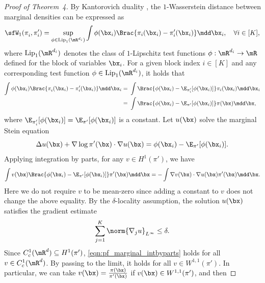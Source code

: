 \documentclass[11pt]{article}
\newcommand{\Lip}{{\rm Lip}}
\begin{document}
\begin{proof}[Proof of Theorem~4]
By Kantorovich duality \cite{MR2459454}, the $1$-Wasserstein distance between marginal densities can be expressed as
\begin{equation}
    \sfW_1(\pi_i^{},\pi_i') = \sup_{\phi \in \Lip_1(\mR^{d_i})} \int \phi (\bx_i) \Brac{ \pi_i(\bx_i) - \pi_i' (\bx_i)} \mdd \bx_i, \quad \forall i \in [K],
\end{equation}
where $\Lip_1(\mR^{d_i})$ denotes the class of $1$-Lipschitz test functions $\phi: \mR^{d_i} \rightarrow \mR$ defined for the block of variables $\bx_i$.
%
For a given block index $i \in [K]$ and any corresponding test function $\phi \in \Lip_1(\mR^{d_i})$, it holds that
\begin{equation}
\begin{split}
    \int \phi (\bx_i) \Brac{ \pi_i^{} (\bx_i) - \pi_i' (\bx_i)} \mdd \bx_i =~& \int \Brac{ \phi (\bx_i) - \E_{\pi_i'}[\phi(\bx_i)] } \pi_i(\bx_i) \mdd \bx_i \\
    =~& \int \Brac{ \phi (\bx_i) - \E_{\pi'}[\phi(\bx_i)] } \pi(\bx) \mdd \bx,
\end{split}
\end{equation}
where $\E_{\pi_i'}[\phi(\bx_i)] = \E_{\pi'}[\phi(\bx_i)]$ is a constant.
%
Let $u(\bx)$ solve the marginal Stein equation
\begin{equation}
    \Delta u(\bx) + \nabla \log \pi' (\bx) \cdot \nabla u(\bx) = \phi(\bx_i) - \E_{\pi'} [\phi(\bx_i)].
\end{equation}
Applying integration by parts, for any $v \in H^1(\pi')$, we have
\begin{equation}
\label{eqn:pf_marginal_intbyparts}
    \int v(\bx) \Brac{ \phi(\bx_i) - \E_{\pi'} [\phi(\bx_i)] } \pi' (\bx) \mdd \bx = - \int \nabla v(\bx) \cdot \nabla u(\bx) \pi' (\bx) \mdd \bx.
\end{equation}
Here we do not require $v$ to be mean-zero since adding a constant to $v$ does not change the above equality.
By the $\delta$-locality assumption, the solution $u(\bx)$ satisfies the gradient estimate
\begin{equation}
\label{eqn:pf_marginal_grad_est}
    \sum_{j=1}^K \norm{\nabla_j u}_{L^\infty} \le \delta.
\end{equation}
Since $C_c^1(\mR^d) \subseteq H^1(\pi')$, \eqref{eqn:pf_marginal_intbyparts} holds for all $v \in C_c^1(\mR^d)$. By passing to the limit, it holds for all $v \in W^{1,1}(\pi')$. In particular, we can take $v(\bx) = \frac{\pi(\bx)}{\pi'(\bx)}$ if $v(\bx) \in W^{1,1}(\pi')$, and then

\end{proof}
\end{document}
